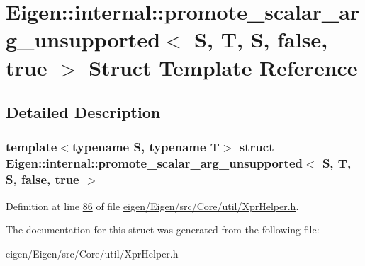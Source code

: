 \hypertarget{struct_eigen_1_1internal_1_1promote__scalar__arg__unsupported_3_01_s_00_01_t_00_01_s_00_01false_00_01true_01_4}{}\section{Eigen\+:\+:internal\+:\+:promote\+\_\+scalar\+\_\+arg\+\_\+unsupported$<$ S, T, S, false, true $>$ Struct Template Reference}
\label{struct_eigen_1_1internal_1_1promote__scalar__arg__unsupported_3_01_s_00_01_t_00_01_s_00_01false_00_01true_01_4}


\subsection{Detailed Description}
\subsubsection*{template$<$typename S, typename T$>$\newline
struct Eigen\+::internal\+::promote\+\_\+scalar\+\_\+arg\+\_\+unsupported$<$ S, T, S, false, true $>$}



Definition at line \hyperlink{eigen_2_eigen_2src_2_core_2util_2_xpr_helper_8h_source_l00086}{86} of file \hyperlink{eigen_2_eigen_2src_2_core_2util_2_xpr_helper_8h_source}{eigen/\+Eigen/src/\+Core/util/\+Xpr\+Helper.\+h}.



The documentation for this struct was generated from the following file\+:\begin{DoxyCompactItemize}
\item 
eigen/\+Eigen/src/\+Core/util/\+Xpr\+Helper.\+h\end{DoxyCompactItemize}

